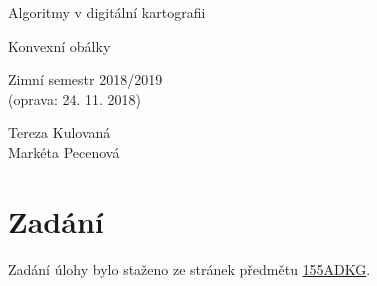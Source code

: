 \documentclass[a4paper, 12pt]{article}
\begin{document}
\begin{titlepage}
\begin{center}
\Huge
\vspace*{4.5cm}
Algoritmy v digitální kartografii \\
\vspace{0.2cm}

\Large  
Konvexní obálky\\
\vspace{0.2cm}

\normalsize  
Zimní semestr 2018/2019\\
(oprava: 24. 11. 2018)
\vspace{14cm}
\end{center}

\begin{flushright}
\Large
Tereza Kulovaná \\
Markéta Pecenová \\
\end{flushright}

\end{titlepage}


\pagestyle{plain}     %
\setcounter{page}{1}  %

\tableofcontents
\newpage

\section{Zadání}
Zadání úlohy bylo staženo ze stránek předmětu \href{https://web.natur.cuni.cz/~bayertom/index.php/teaching/algoritmy-v-digitalni-kartografii}{155ADKG}.
\end{document}
